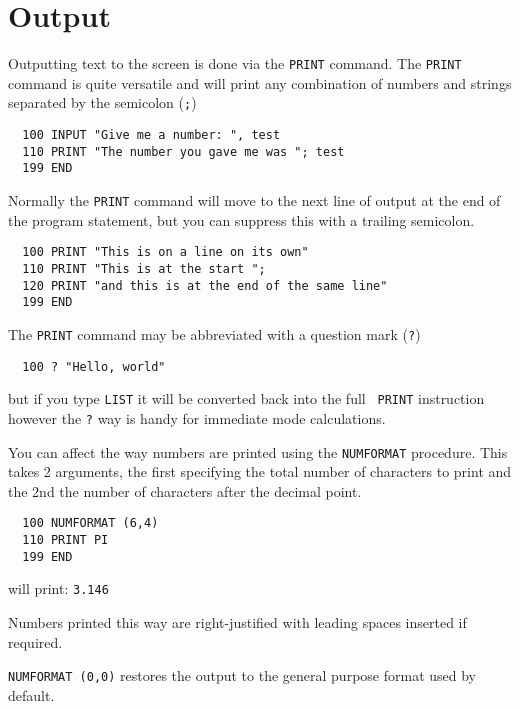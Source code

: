 \section{Output}
Outputting text to the screen is done via the {\tt PRINT}
command. The {\tt PRINT} command is quite versatile and
will print any combination of numbers and strings separated
by the semicolon ({\tt ;})
\begin{verbatim}
  100 INPUT "Give me a number: ", test
  110 PRINT "The number you gave me was "; test
  199 END
\end{verbatim}
Normally the {\tt PRINT} command will move to the next line of
output at the end of the program statement, but you can suppress
this with a trailing semicolon.
\begin{verbatim}
  100 PRINT "This is on a line on its own"
  110 PRINT "This is at the start ";
  120 PRINT "and this is at the end of the same line"
  199 END
\end{verbatim}
The {\tt PRINT} command may be abbreviated with a question mark ({\tt ?})
\begin{verbatim}
  100 ? "Hello, world"
\end{verbatim}
but if you type {\tt LIST} it will be converted back into the full {\tt
PRINT} instruction however the {\tt ?} way is handy for immediate mode
calculations.

You can affect the way numbers are printed using the {\tt NUMFORMAT}
procedure. This takes 2 arguments, the first specifying the total
number of characters to print and the 2nd the number of characters
after the decimal point.

\begin{verbatim}
  100 NUMFORMAT (6,4)
  110 PRINT PI
  199 END
\end{verbatim}
will print: {\tt 3.146}

Numbers printed this way are right-justified with leading spaces inserted
if required.

{\tt NUMFORMAT (0,0)} restores the output to the general purpose format
used by default.
